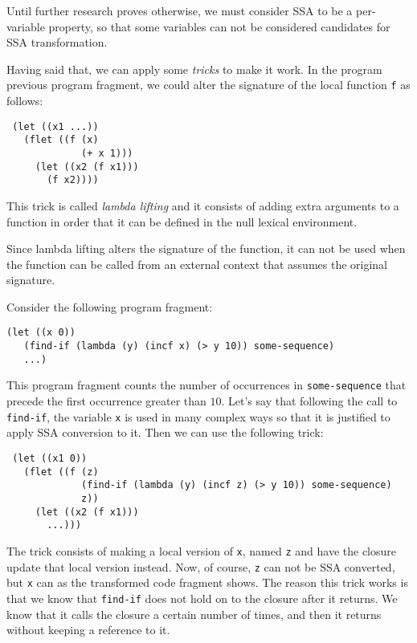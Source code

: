 Until further research proves otherwise, we must consider SSA to be a
per-variable property, so that some variables can not be considered
candidates for SSA transformation.

Having said that, we can apply some \emph{tricks} to make it work.  In
the program previous program fragment, we could alter the signature of
the local function \texttt{f} as follows:

\begin{verbatim}
 (let ((x1 ...))
   (flet ((f (x)
             (+ x 1)))
     (let ((x2 (f x1)))
       (f x2))))
\end{verbatim}

This trick is called \emph{lambda lifting} and it consists of adding
extra arguments to a function in order that it can be defined in the
null lexical environment.  

Since lambda lifting alters the signature of the function, it can not
be used when the function can be called from an external context that
assumes the original signature. 

Consider the following program fragment:

\begin{verbatim}
(let ((x 0))
   (find-if (lambda (y) (incf x) (> y 10)) some-sequence)
   ...)
\end{verbatim}

This program fragment counts the number of occurrences in
\texttt{some-sequence} that precede the first occurrence greater than
$10$.  Let's say that following the call to \texttt{find-if}, the
variable \texttt{x} is used in many complex ways so that it is
justified to apply SSA conversion to it.  Then we can use the
following trick:

\begin{verbatim}
 (let ((x1 0))
   (flet ((f (z)
             (find-if (lambda (y) (incf z) (> y 10)) some-sequence)
             z))
     (let ((x2 (f x1)))
       ...)))
\end{verbatim}

The trick consists of making a local version of \texttt{x}, named
\texttt{z} and have the closure update that local version instead.
Now, of course, \texttt{z} can not be SSA converted, but \texttt{x}
can as the transformed code fragment shows.  The reason this trick
works is that we know that \texttt{find-if} does not hold on to the
closure after it returns.  We know that it calls the closure a certain
number of times, and then it returns without keeping a reference to
it.%

